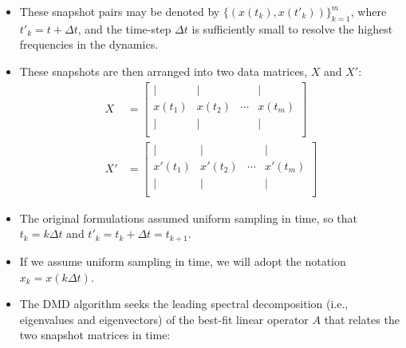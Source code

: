 \documentclass[hyperref={pdfpagemode=FullScreen},aspectratio=169]{beamer}
\begin{document}
\begin{frame}{}
\begin{itemize}
\setlength\itemsep{1em}
\item These snapshot pairs may be denoted by $\{(x(t_k),x(t'_k))\}_{k=1}^{m}$, where $t'_k=t+\Delta t$, and the time-step $\Delta t$ is sufficiently small to resolve the highest frequencies in the dynamics. 
\item These snapshots are then arranged into two data matrices, $X$ and $X'$:
\begin{align}
X&=\begin{bmatrix}
| & | & &|\\
x(t_1) & x(t_2) & \cdots & x(t_m)\\
| & | & &|\\
\end{bmatrix} \\
X'&=\begin{bmatrix}
| & | & &|\\
x'(t_1) & x'(t_2) & \cdots & x'(t_m)\\
| & | & &|\\
\end{bmatrix}
\end{align}
\item The original formulations assumed uniform sampling in time, so that $t_k=k\Delta t$ and $t'_k=t_k+\Delta t = t_{k+1}$.
\item If we assume uniform sampling in time, we will adopt the notation $x_k = x(k\Delta t)$.
\item The DMD algorithm seeks the leading spectral decomposition (i.e., eigenvalues and eigenvectors) of the best-fit linear operator $A$ that relates the two snapshot matrices in time:
\end{itemize}
\end{frame}
\end{document}
